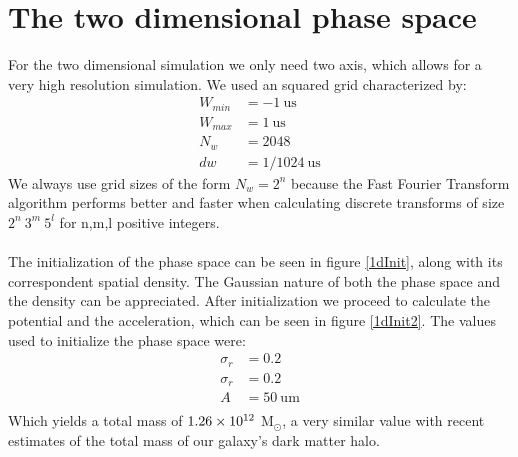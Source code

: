 \section{The two dimensional phase space}
\vspace{-5mm} \vspace{1mm}

For the two dimensional simulation we only need two axis, which allows for a very high resolution simulation. We used an squared grid characterized by:
\begin{align}
W_{min} &= -1 \ \text{us}\\
W_{max} &= 1 \ \text{us}\\
N_w &= 2048\\
dw &= 1/1024 \ \text{us}
\end{align}
We always use grid sizes of the form $N_w = 2^n$ because the Fast Fourier Transform algorithm performs better and faster when calculating discrete transforms of size $2^n \ 3^m \ 5^l$ for n,m,l positive integers.\\ \\ 
\vspace{-1mm}
The initialization of the phase space can be seen in figure \ref{1dInit}, along with its correspondent spatial density.
The Gaussian nature of both the phase space and the density can be appreciated. 
After initialization we proceed to calculate the potential and the acceleration, which can be seen in figure \ref{1dInit2}.
The values used to initialize the phase space were:
\begin{align}
\sigma_r &= 0.2\\
\sigma_r &= 0.2\\
A &= 50  \ \text{um} \\
\end{align}
Which yields a total mass of $1.26\times 10^{12}$ M$_{\odot}$, a very similar value with recent estimates of the total mass of our galaxy's dark matter halo. %



